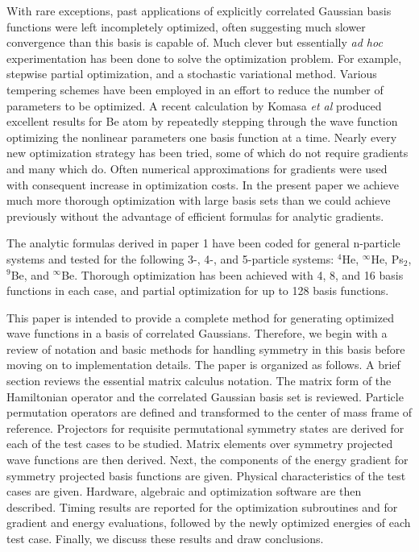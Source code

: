 \documentclass[12pt,thmsa]{article}
\begin{document}
With rare exceptions, past applications of explicitly correlated Gaussian
basis functions were left incompletely optimized, often suggesting much
slower convergence than this basis is capable of. Much clever but
essentially \textit{ad hoc} experimentation has been done to solve the
optimization problem. For example, stepwise partial optimization\cite
{Kinghorn93}, and a stochastic variational method\cite{Varga96}. Various
tempering schemes have been employed in an effort to reduce the number of
parameters to be optimized\cite
{Poshusta79:temp,Monkhorst86:temp,Alexander90,Rybak89}. A recent calculation
by Komasa \textit{et al}\cite{Komasa95} produced excellent results for Be
atom by repeatedly stepping through the wave function optimizing the
nonlinear parameters one basis function at a time. Nearly every new
optimization strategy has been tried, some of which do not require gradients
and many which do. Often numerical approximations for gradients were used
with consequent increase in optimization costs\cite
{Kinghorn93,Kozlowski93b,Schwegler93}. In the present paper we achieve much
more thorough optimization with large basis sets than we could achieve
previously without the advantage of efficient formulas for analytic
gradients.

The analytic formulas derived in paper 1 have been coded for general
n-particle systems and tested for the following 3-, 4-, and 5-particle
systems: $^4$He, $^\infty $He, Ps$_2$, $^9$Be, and $^\infty $Be. Thorough
optimization has been achieved with 4, 8, and 16 basis functions in each
case, and partial optimization for up to 128 basis functions.

This paper is intended to provide a complete method for generating optimized
wave functions in a basis of correlated Gaussians. Therefore, we begin with
a review of notation and basic methods for handling symmetry in this basis
before moving on to implementation details. The paper is organized as
follows. A brief section reviews the essential matrix calculus notation. The
matrix form of the Hamiltonian operator and the correlated Gaussian basis
set is reviewed. Particle permutation operators are defined and transformed
to the center of mass frame of reference. Projectors for requisite
permutational symmetry states are derived for each of the test cases to be
studied. Matrix elements over symmetry projected wave functions are then
derived. Next, the components of the energy gradient for symmetry projected
basis functions are given. Physical characteristics of the test cases are
given. Hardware, algebraic and optimization software are then described.
Timing results are reported for the optimization subroutines and for
gradient and energy evaluations, followed by the newly optimized energies of
each test case. Finally, we discuss these results and draw conclusions.
\end{document}
